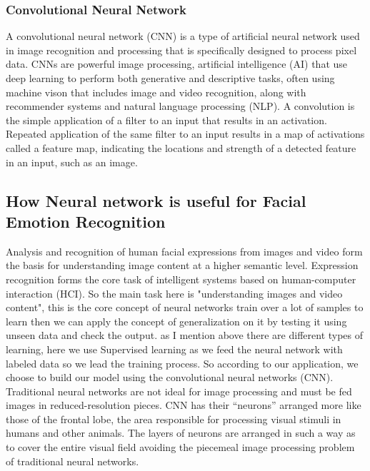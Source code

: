 \subsubsection{Convolutional Neural Network}
A convolutional neural network (CNN) is a type of artificial neural network used in image recognition and processing that is specifically designed to process pixel data.
\newline
CNNs are powerful image processing, artificial intelligence (AI) that use deep learning to perform both generative and descriptive tasks, often using machine vison that includes image and video recognition, along with recommender systems and natural language processing (NLP).
\newline
A convolution is the simple application of a filter to an input that results in an activation. Repeated application of the same filter to an input results in a map of activations called a feature map, indicating the locations and strength of a detected feature in an input, such as an image.

\subsection{How Neural network is  useful for Facial Emotion Recognition}
Analysis and recognition of human facial expressions
from images and video form the basis for understanding
image content at a higher semantic level. Expression
recognition forms the core task of intelligent systems
based on human-computer interaction (HCI). So the main task here is "understanding images and video content", this is the core concept of neural networks train over a lot of samples to learn then we can apply the concept of generalization on it by testing it using unseen data and check the output. 
as I mention above  there are different types of learning, here we  use Supervised learning as we feed the neural network with labeled data so we lead the training process.
\newline
So according to our application, we choose to build our model using the convolutional neural networks (CNN).
\newline
Traditional neural networks are not ideal for image processing and must be fed images in reduced-resolution pieces. CNN has their “neurons” arranged more like those of the frontal lobe, the area responsible for processing visual stimuli in humans and other animals. The layers of neurons are arranged in such a way as to cover the entire visual field avoiding the piecemeal image processing problem of traditional neural networks.

